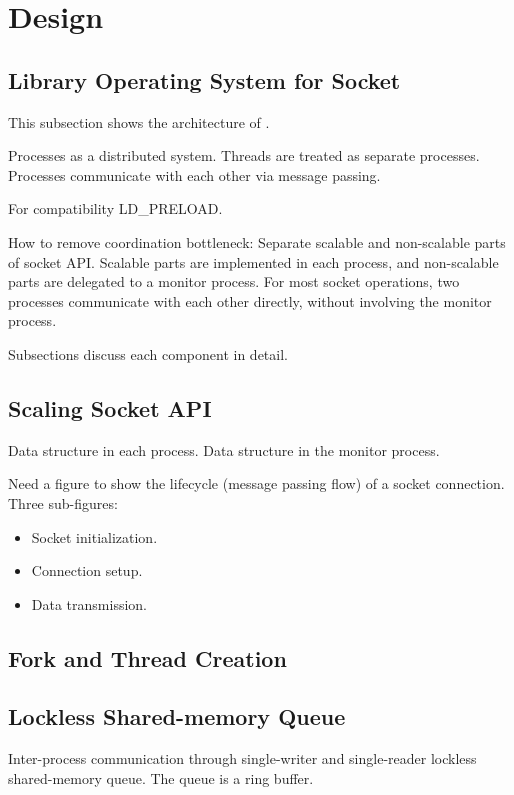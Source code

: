 \section{Design}
\label{sec:design}

\subsection{Library Operating System for Socket}

This subsection shows the architecture of \sys.

Processes as a distributed system.
Threads are treated as separate processes.
Processes communicate with each other via message passing.

For compatibility
LD\_PRELOAD.

How to remove coordination bottleneck:
Separate scalable and non-scalable parts of socket API.
Scalable parts are implemented in each process, and non-scalable parts are delegated to a monitor process.
For most socket operations, two processes communicate with each other directly, without involving the monitor process.

Subsections discuss each component in detail.


\subsection{Scaling Socket API}

Data structure in each process. Data structure in the monitor process.

Need a figure to show the lifecycle (message passing flow) of a socket connection. Three sub-figures:

\begin{itemize}
	\item Socket initialization.
	\item Connection setup.
	\item Data transmission.
\end{itemize}

\subsection{Fork and Thread Creation}


\subsection{Lockless Shared-memory Queue}

Inter-process communication through single-writer and single-reader lockless shared-memory queue. The queue is a ring buffer.

